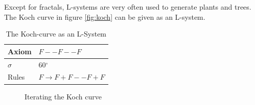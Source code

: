\documentclass[11pt,a4paper]{article}
\newcommand{\degree}{\ensuremath{^\circ}}
\begin{document}
Except for fractals, L-systems are very often used to generate plants and trees. The Koch curve in figure \ref{fig:koch} can be given as an L-system.

\begin{table}
\center
\begin{tabular}{l l}
Axiom & $F--F--F$ \\ \hline
$\sigma$ & 60\degree \\ \hline
Rules & $F \rightarrow F+F--F+F$ \\
\end{tabular}
\caption{The Koch-curve as an L-System}
\end{table}

\begin{figure}[h]
  \centering
  \hspace{0.01\textwidth}
  \hspace{0.01\textwidth}
  \hspace{0.01\textwidth}
  \caption{Iterating the Koch curve}
  \label{fig:animals}
\end{figure}
\end{document}
